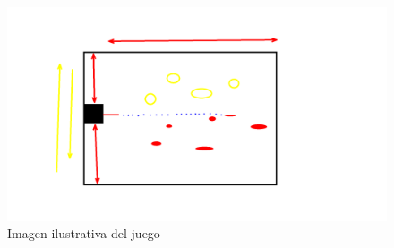 \documentclass{article}
\begin{document}
\begin{figure}[h]
\includegraphics[width=12cm]{cañon.png}
\centering
\caption{Imagen ilustrativa del juego}
\label{fig:cpplogo}
\end{figure}



\end{document}
